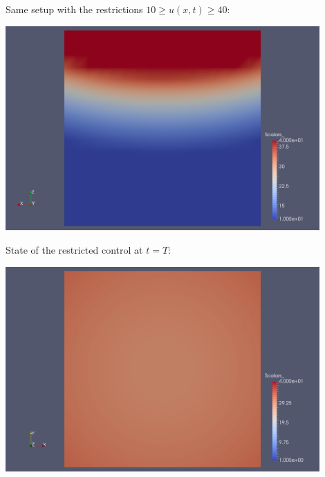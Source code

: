 \documentclass[10pt, USenglish]{beamer}
\begin{document}
\begin{frame}
Same setup with the restrictions $10 \geq u(x, t) \geq 40$:
\begin{center}
\includegraphics[width=0.9\textwidth]{../thesis/Images/boundary-cont-u-rest.png}
\end{center}
\end{frame}

\begin{frame}
State of the restricted control at $t = T$:
\begin{center}
\includegraphics[width=0.9\textwidth]{../thesis/Images/boundary-cont-y-rest.png}
\end{center}
\end{frame}


\end{document}

